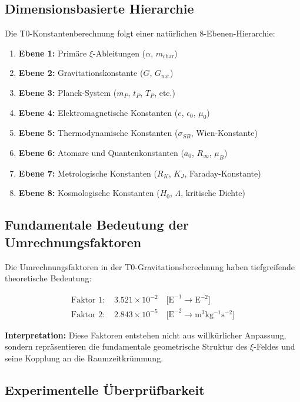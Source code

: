 \documentclass[12pt,a4paper]{report}
\begin{document}
	\subsection{Dimensionsbasierte Hierarchie}
	
	Die T0-Konstantenberechnung folgt einer natürlichen 8-Ebenen-Hierarchie:
	
	\begin{enumerate}
		\item \textbf{Ebene 1:} Primäre $\xi$-Ableitungen ($\alpha$, $m_{\text{char}}$)
		\item \textbf{Ebene 2:} Gravitationskonstante ($G$, $G_{\text{nat}}$)
		\item \textbf{Ebene 3:} Planck-System ($m_P$, $t_P$, $T_P$, etc.)
		\item \textbf{Ebene 4:} Elektromagnetische Konstanten ($e$, $\epsilon_0$, $\mu_0$)
		\item \textbf{Ebene 5:} Thermodynamische Konstanten ($\sigma_{SB}$, Wien-Konstante)
		\item \textbf{Ebene 6:} Atomare und Quantenkonstanten ($a_0$, $R_\infty$, $\mu_B$)
		\item \textbf{Ebene 7:} Metrologische Konstanten ($R_K$, $K_J$, Faraday-Konstante)
		\item \textbf{Ebene 8:} Kosmologische Konstanten ($H_0$, $\Lambda$, kritische Dichte)
	\end{enumerate}
	
	\subsection{Fundamentale Bedeutung der Umrechnungsfaktoren}
	
	Die Umrechnungsfaktoren in der T0-Gravitationsberechnung haben tiefgreifende theoretische Bedeutung:
	
	\begin{align}
		\text{Faktor 1: } &3.521 \times 10^{-2} \quad \text{[E}^{-1} \rightarrow \text{E}^{-2}\text{]} \\
		\text{Faktor 2: } &2.843 \times 10^{-5} \quad \text{[E}^{-2} \rightarrow \si{\meter^3 \kilogram^{-1} \second^{-2}}\text{]}
	\end{align}
	
	\textbf{Interpretation:} Diese Faktoren entstehen nicht aus willkürlicher Anpassung, sondern repräsentieren die fundamentale geometrische Struktur des $\xi$-Feldes und seine Kopplung an die Raumzeitkrümmung.
	
	\subsection{Experimentelle Überprüfbarkeit}
	
\end{document}
